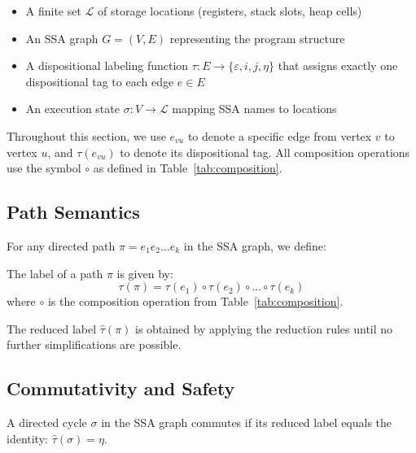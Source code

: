 \documentclass[journal]{IEEEtran}
\begin{document}
\begin{itemize}
\item A finite set $\mathcal{L}$ of storage locations (registers, stack slots, heap cells)
\item An SSA graph $G = (V, E)$ representing the program structure  
\item A dispositional labeling function $\tau: E \to \{\varepsilon, i, j, \eta\}$ that assigns exactly one dispositional tag to each edge $e \in E$
\item An execution state $\sigma: V \to \mathcal{L}$ mapping SSA names to locations
\end{itemize}

Throughout this section, we use $e_{vu}$ to denote a specific edge from vertex $v$ to vertex $u$, and $\tau(e_{vu})$ to denote its dispositional tag. All composition operations use the symbol $\circ$ as defined in Table~\ref{tab:composition}.

\subsection{Path Semantics}

For any directed path $\pi = e_1 e_2 \ldots e_k$ in the SSA graph, we define:

\begin{definition}
The label of a path $\pi$ is given by:
\begin{equation}
\tau(\pi) = \tau(e_1) \circ \tau(e_2) \circ \ldots \circ \tau(e_k)
\end{equation}
where $\circ$ is the composition operation from Table~\ref{tab:composition}.
\end{definition}

\begin{definition}  
The reduced label $\hat{\tau}(\pi)$ is obtained by applying the reduction rules until no further simplifications are possible.
\end{definition}

\subsection{Commutativity and Safety}

\begin{definition}
A directed cycle $\sigma$ in the SSA graph commutes if its reduced label equals the identity: $\hat{\tau}(\sigma) = \eta$.
\end{definition}
\end{document}
